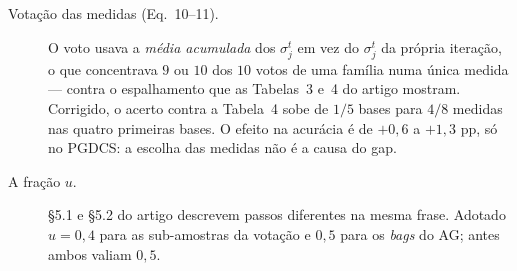 \begin{description}
\item[Votação das medidas (Eq.~10--11).] O voto usava a \emph{média acumulada} dos
$\sigma_j^t$ em vez do $\sigma_j^t$ da própria iteração, o que concentrava $9$ ou
$10$ dos $10$ votos de uma família numa única medida --- contra o espalhamento que
as Tabelas~3 e~4 do artigo mostram. Corrigido, o acerto contra a Tabela~4 sobe de
$1/5$ bases para $4/8$ medidas nas quatro primeiras bases. O efeito na acurácia é
de $+0{,}6$ a $+1{,}3$ pp, só no PGDCS: a escolha das medidas não é a causa do gap.

\item[A fração $u$.] §5.1 e §5.2 do artigo descrevem passos diferentes na mesma
frase. Adotado $u=0{,}4$ para as sub-amostras da votação e $0{,}5$ para os
\emph{bags} do AG; antes ambos valiam $0{,}5$.
\end{description}
